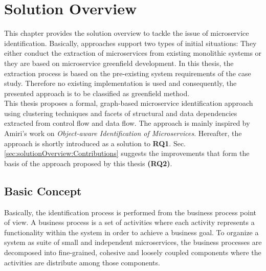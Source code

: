 \chapter{Solution Overview}
\label{ch:SolutionOverview}
This chapter provides the solution overview to tackle the issue of microservice identification. Basically, approaches support two types of initial situations: They either conduct the extraction of microservices from existing monolithic systems or they are based on microservice greenfield development. In this thesis, the extraction process is based on the pre-existing system requirements of the case study. Therefore no existing implementation is used and consequently, the presented approach is to be classified as greenfield method.\\
This thesis proposes a formal, graph-based microservice identification approach using clustering techniques and facets of structural and data dependencies extracted from control flow and data flow. The approach is mainly inspired by Amiri's  work on \textit{Object-aware Identification of Microservices}. Hereafter, the approach \cite{ObjectAwareAmiri} is shortly introduced as a solution to \textbf{RQ1}. Sec.\ref{sec:solutionOverview:Contributions} suggests the improvements that form the basis of the approach proposed by this thesis \textbf{(RQ2)}.


\section{Basic Concept}
\label{sec:solutionOverview:basicConcept}
Basically, the identification process is performed from the business process point of view. A business process is a set of activities where each activity represents a functionality within the system in order to achieve a business goal. To organize a system as suite of small and independent microservices, the business processes are decomposed into fine-grained, cohesive and loosely coupled components where the activities are distribute among those components.\\



